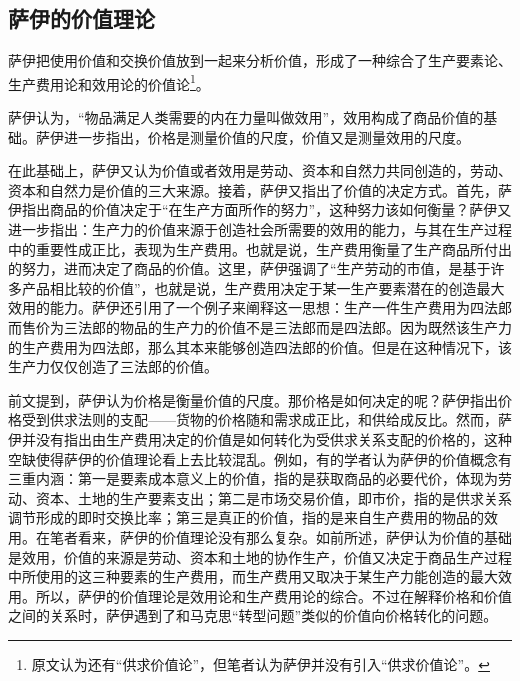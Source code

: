 \subsection{萨伊的价值理论}

萨伊把使用价值和交换价值放到一起来分析价值，形成了一种综合了生产要素论、生产费用论和效用论的价值论\footnote{原文认为还有“供求价值论”，但笔者认为萨伊并没有引入“供求价值论”。}\cite[138]{YanZhiJieXiFangJingJiXueShuoShiJiaoChengDiErBan2013}。

萨伊认为，“物品满足人类需要的内在力量叫做效用”，效用构成了商品价值的基础\cite[59]{SaYiZhengZhiJingJiXueGaiLunCaiFuDeShengChanFenPeiHeXiaoFei2020}。萨伊进一步指出，价格是测量价值的尺度，价值又是测量效用的尺度\cite[60]{SaYiZhengZhiJingJiXueGaiLunCaiFuDeShengChanFenPeiHeXiaoFei2020}。

在此基础上，萨伊又认为价值或者效用是劳动、资本和自然力共同创造的\cite[78]{SaYiZhengZhiJingJiXueGaiLunCaiFuDeShengChanFenPeiHeXiaoFei2020}，劳动、资本和自然力是价值的三大来源。接着，萨伊又指出了价值的决定方式。首先，萨伊指出商品的价值决定于“在生产方面所作的努力”\cite[351]{SaYiZhengZhiJingJiXueGaiLunCaiFuDeShengChanFenPeiHeXiaoFei2020}，这种努力该如何衡量？萨伊又进一步指出：生产力的价值来源于创造社会所需要的效用的能力，与其在生产过程中的重要性成正比，表现为生产费用\cite[352]{SaYiZhengZhiJingJiXueGaiLunCaiFuDeShengChanFenPeiHeXiaoFei2020}。也就是说，生产费用衡量了生产商品所付出的努力，进而决定了商品的价值。这里，萨伊强调了“生产劳动的市值，是基于许多产品相比较的价值”\cite[352]{SaYiZhengZhiJingJiXueGaiLunCaiFuDeShengChanFenPeiHeXiaoFei2020}，也就是说，生产费用决定于某一生产要素潜在的创造最大效用的能力。萨伊还引用了一个例子来阐释这一思想：生产一件生产费用为四法郎而售价为三法郎的物品的生产力的价值不是三法郎而是四法郎。因为既然该生产力的生产费用为四法郎，那么其本来能够创造四法郎的价值。但是在这种情况下，该生产力仅仅创造了三法郎的价值\cite[352]{SaYiZhengZhiJingJiXueGaiLunCaiFuDeShengChanFenPeiHeXiaoFei2020}。

前文提到，萨伊认为价格是衡量价值的尺度。那价格是如何决定的呢？萨伊指出价格受到供求法则的支配——货物的价格随和需求成正比，和供给成反比\cite[256]{SaYiZhengZhiJingJiXueGaiLunCaiFuDeShengChanFenPeiHeXiaoFei2020}。然而，萨伊并没有指出由生产费用决定的价值是如何转化为受供求关系支配的价格的，这种空缺使得萨伊的价值理论看上去比较混乱。例如，有的学者认为萨伊的价值概念有三重内涵：第一是要素成本意义上的价值，指的是获取商品的必要代价，体现为劳动、资本、土地的生产要素支出；第二是市场交易价值，即市价，指的是供求关系调节形成的即时交换比率；第三是真正的价值，指的是来自生产费用的物品的效用\cite[138]{YanZhiJieXiFangJingJiXueShuoShiJiaoChengDiErBan2013}\cite[175]{CaiJiMingCongGuDianZhengZhiJingJiXueDaoZhongGuoTeSeSheHuiZhuYiZhengZhiJingJiXueJiYuZhongGuoShiJiaoDeZhengZhiJingJiXueYanBianShangCe2023}。在笔者看来，萨伊的价值理论没有那么复杂。如前所述，萨伊认为价值的基础是效用，价值的来源是劳动、资本和土地的协作生产，价值又决定于商品生产过程中所使用的这三种要素的生产费用，而生产费用又取决于某生产力能创造的最大效用。所以，萨伊的价值理论是效用论和生产费用论的综合。不过在解释价格和价值之间的关系时，萨伊遇到了和马克思“转型问题”类似的价值向价格转化的问题。

